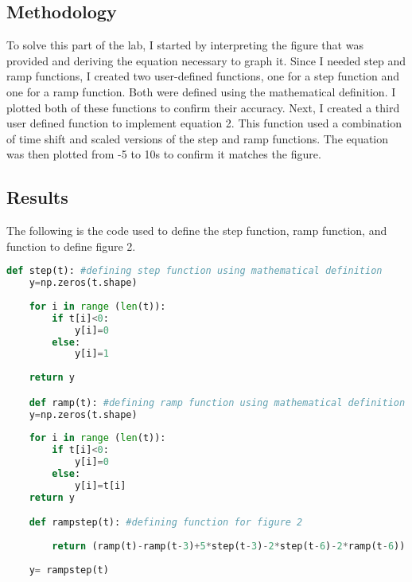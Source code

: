 \documentclass[12pt, titlepage]{article}
\begin{document}
            \subsection{Methodology}
            To solve this part of the lab, I started by interpreting the figure that was provided and deriving the equation necessary to graph it.  Since I needed step and ramp functions, I created two user-defined functions, one for a step function and one for a ramp function.  Both were defined using the mathematical definition. I plotted both of these functions to confirm their accuracy. Next, I created a third user defined function to implement equation 2.  This function used a combination of time shift and scaled versions of the step and ramp functions.  The equation was then plotted from -5 to 10s to confirm it matches the figure.
            
            \subsection{Results}
            The following is the code used to define the step function, ramp function, and function to define figure 2.
            
            \lstset{language=Python}
            \lstset{frame=lines}
            \lstset{basicstyle=\footnotesize}
            \begin{lstlisting}[language=Python, caption=Part 2 Code]
    def step(t): #defining step function using mathematical definition
    y=np.zeros(t.shape)
    
    for i in range (len(t)):
        if t[i]<0:
            y[i]=0
        else:
            y[i]=1
            
    return y    

    def ramp(t): #defining ramp function using mathematical definition
    y=np.zeros(t.shape)
    
    for i in range (len(t)):
        if t[i]<0:
            y[i]=0
        else:
            y[i]=t[i]
    return y  

    def rampstep(t): #defining function for figure 2
        
        return (ramp(t)-ramp(t-3)+5*step(t-3)-2*step(t-6)-2*ramp(t-6))
    
    y= rampstep(t)
    
            \end{lstlisting}
            
\end{document}

